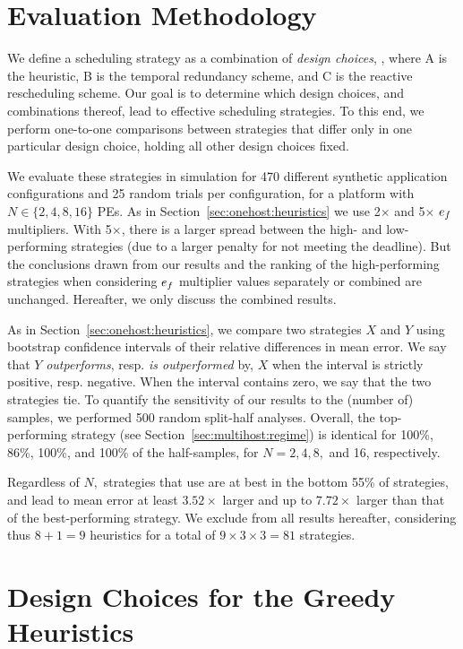 \section{Evaluation Methodology}

We define a scheduling strategy as a combination of \emph{design choices},
, where A is the heuristic, B is the temporal redundancy
scheme, and C is the reactive rescheduling scheme.  Our goal is to
determine which design choices, and combinations thereof, lead to effective
scheduling strategies.  To this end, we perform one-to-one comparisons
between strategies that differ only in one particular design choice,
holding all other design choices fixed.

We evaluate these strategies in simulation for 470 different synthetic
application configurations and 25 random trials per configuration, for a
platform with $N{\in}\{2, 4, 8, 16\}$ PEs.  As in
Section~\ref{sec:onehost:heuristics} we use 2$\times$ and 5$\times$ $e_{f}$
multipliers.  With 5$\times$, there is a larger spread
between the high- and low-performing strategies (due to a larger penalty
for not meeting the deadline).  But the conclusions drawn from our results
and the ranking of the high-performing strategies when
considering $e_{f}$ multiplier values separately or combined are
unchanged.  Hereafter, we only discuss the combined results.  

As in Section~\ref{sec:onehost:heuristics}, we compare two strategies $X$ and
$Y$ using bootstrap confidence intervals of their relative differences in
mean error.  We say that $Y$ \emph{outperforms}, resp. \emph{is
outperformed} by, $X$ when the interval is strictly positive, resp.
negative.  When the interval contains zero, 
we say that the two strategies tie. To quantify the sensitivity of our
results to the (number of) samples, we performed 500 random split-half
analyses.  Overall, the top-performing strategy (see
Section~\ref{sec:multihost:regime}) is identical for 100\%, 86\%, 100\%,
and 100\% of the half-samples, for $N{=}2, 4, 8,$ and 16, respectively.

Regardless of $N,$ strategies that use \random are at best in the bottom 55\% of
strategies, and lead to mean error at least $3.52\times$ larger and up to $7.72\times$ larger than that of the
best-performing strategy.
We exclude \random from all results hereafter, considering thus
$8{+}1{=}9$ heuristics for a total of $9{\times}3{\times}3{=}81$
strategies.

\section{Design Choices for the Greedy Heuristics}

